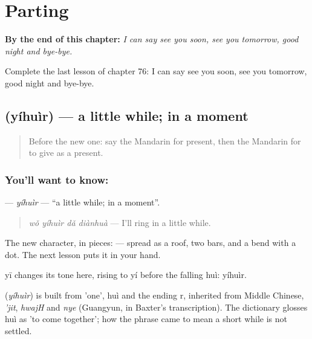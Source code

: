 
\chapter{Parting}
\label{ch:zh-parting}

\begin{chapteropening}
\textbf{By the end of this chapter:} \emph{I can say see you soon, see you tomorrow, good night and bye-bye.}

Complete the last lesson of chapter 76: I can say see you soon, see you tomorrow, good night and bye-bye.
\end{chapteropening}

\section[\texorpdfstring{\zh{一会儿} (yíhuìr)}{一会儿 (yíhuìr)}]{ (yíhuìr) — a little while; in a moment}

\label{lesson:ZH-C76-yihuir}



\begin{quote}
Before the new one: say the Mandarin for present, then the Mandarin for to give as a present.
\end{quote}

\subsection*{You'll want to know: }
\textbf{} — \emph{yíhuìr} — \textquotedblleft{}a little while; in a moment\textquotedblright{}.

\begin{quote}
\textbf{} \emph{wǒ yíhuìr dǎ diànhuà} — I'll ring in a little while.
\end{quote}

The new character, in pieces:  —  spread as a roof, two bars, and a bend with a dot. The next lesson puts it in your hand.

yī changes its tone here, rising to yí before the falling huì: yíhuìr.

\begin{cousinweb}
\textbf{} (\emph{yíhuìr}) is built from  'one', huì and the ending r, inherited from Middle Chinese, \emph{'jit}, \emph{hwajH} and \emph{nye} (Guangyun, in Baxter's transcription). The dictionary glosses huì as 'to come together'; how the phrase came to mean a short while is not settled.
\end{cousinweb}

